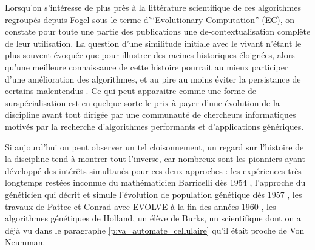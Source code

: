 Lorsqu'on s'intéresse de plus près à la littérature scientifique de ces algorithmes regroupés depuis Fogel sous le terme d'\foreignquote{english}{Evolutionary Computation} (EC), on constate pour toute une partie des publications une de-contextualisation complète de leur utilisation. La question d'une similitude initiale avec le vivant n'étant le plus souvent évoquée que pour illustrer des racines historiques éloignées, alors qu'une meilleure connaissance de cette histoire pourrait au mieux participer d'une amélioration des algorithmes, et au pire au moins éviter la persistance de certains malentendus \autocite{DeJong1993a}. Ce qui peut apparaitre comme une forme de surspécialisation est en quelque sorte le prix à payer d'une évolution de la discipline avant tout dirigée par une communauté de chercheurs informatiques motivés par la recherche d'algorithmes performants et d'applications génériques.

Si aujourd'hui on peut observer un tel cloisonnement, un regard sur l'histoire de la discipline tend à montrer tout l'inverse, car nombreux sont les pionniers ayant développé des intérêts simultanés pour ces deux approches : les expériences très longtemps restées inconnue du mathématicien Barricelli dès 1954 , l'approche du généticien \textcite{Fraser1957} qui décrit et simule l'évolution de population génétique dès 1957 , les travaux de Pattee et Conrad avec EVOLVE à la fin des années 1960 \autocite{Conrad1970}, les algorithmes génétiques  de Holland, un élève de Burks, un scientifique dont on a déjà vu dans le paragraphe \ref{p:va_automate_cellulaire} qu'il était proche de Von Neumman.

